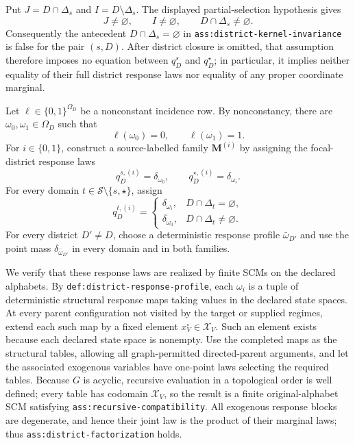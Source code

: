Put \(J=D\cap\Delta_s\) and \(I=D\setminus\Delta_s\).  The displayed
partial-selection hypothesis gives
\[
J\ne\varnothing,\qquad I\ne\varnothing,\qquad D\cap\Delta_s\ne\varnothing.
\tag{1}
\]
Consequently the antecedent \(D\cap\Delta_s=\varnothing\) in
\texttt{ass:district-kernel-invariance} is false for the pair \((s,D)\).
After district closure is omitted, that assumption therefore imposes no
equation between \(q_D^s\) and \(q_D^\star\); in particular, it implies
neither equality of their full district response laws nor equality of any
proper coordinate marginal.

Let \(\ell\in\{0,1\}^{\Omega_D}\) be a nonconstant incidence row.  By
nonconstancy, there are \(\omega_0,\omega_1\in\Omega_D\) such that
\[
\ell(\omega_0)=0,\qquad \ell(\omega_1)=1.
\tag{2}
\]
For \(i\in\{0,1\}\), construct a source-labelled family
\(\mathbf M^{(i)}\) by assigning the focal-district response laws
\[
q_D^{s,(i)}=\delta_{\omega_0},
\qquad
q_D^{\star,(i)}=\delta_{\omega_i}.
\tag{3}
\]
For every domain \(t\in\mathcal S\setminus\{s,\star\}\), assign
\[
q_D^{t,(i)}=
\begin{cases}
\delta_{\omega_i},&D\cap\Delta_t=\varnothing,\\
\delta_{\omega_0},&D\cap\Delta_t\ne\varnothing.
\end{cases}
\tag{4}
\]
For every district \(D'\ne D\), choose a deterministic response profile
\(\bar\omega_{D'}\) and use the point mass
\(\delta_{\bar\omega_{D'}}\) in every domain and in both families.

We verify that these response laws are realized by finite SCMs on the
declared alphabets.  By \texttt{def:district-response-profile}, each
\(\omega_i\) is a tuple of deterministic structural response maps taking
values in the declared state spaces.  At every parent configuration not
visited by the target or supplied regimes, extend each such map by a fixed
element \(x_V^\circ\in\mathcal X_V\).  Such an element exists because each
declared state space is nonempty.  Use the completed maps as the structural
tables, allowing all graph-permitted directed-parent arguments, and let the
associated exogenous variables have one-point laws selecting the required
tables.  Because \(G\) is acyclic, recursive evaluation in a topological
order is well defined; every table has codomain \(\mathcal X_V\), so the
result is a finite original-alphabet SCM satisfying
\texttt{ass:recursive-compatibility}.  All exogenous response blocks are
degenerate, and hence their joint law is the product of their marginal
laws; thus \texttt{ass:district-factorization} holds.

